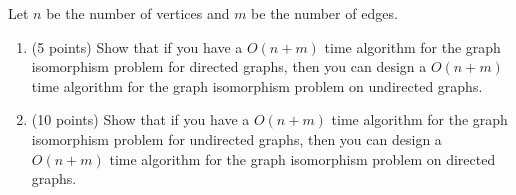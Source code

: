 \documentclass[12pt,letterpaper]{article}
\begin{document}
\begin{enumerate}
    Let $n$ be the number of vertices and $m$ be the number of edges. 
    \begin{enumerate}
        \item (5 points) Show that if you have a $O(n+m)$ time algorithm for the graph isomorphism problem for directed graphs, then you can design a $O(n+m)$ time algorithm for the graph isomorphism problem on undirected graphs. 
        \item (10 points) Show that if you have a $O(n+m)$ time algorithm for the graph isomorphism problem for undirected graphs, then you can design a $O(n+m)$ time algorithm for the graph isomorphism problem on directed graphs. 
    \end{enumerate}
\end{enumerate}
\end{document}
